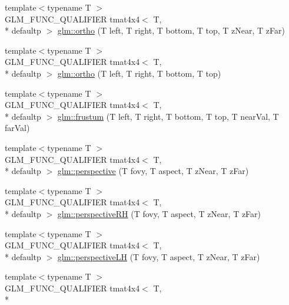 \begin{DoxyCompactItemize}
\item 
{\footnotesize template$<$typename T $>$ }\\G\-L\-M\-\_\-\-F\-U\-N\-C\-\_\-\-Q\-U\-A\-L\-I\-F\-I\-E\-R tmat4x4$<$ T, \\*
defaultp $>$ \hyperlink{group__gtc__matrix__transform_ga65280251de6e38580110a0577a43d8f8}{glm\-::ortho} (T left, T right, T bottom, T top, T z\-Near, T z\-Far)
\item 
{\footnotesize template$<$typename T $>$ }\\G\-L\-M\-\_\-\-F\-U\-N\-C\-\_\-\-Q\-U\-A\-L\-I\-F\-I\-E\-R tmat4x4$<$ T, \\*
defaultp $>$ \hyperlink{group__gtc__matrix__transform_ga45b1b64f99255c07119b4f1aaed04dd7}{glm\-::ortho} (T left, T right, T bottom, T top)
\item 
{\footnotesize template$<$typename T $>$ }\\G\-L\-M\-\_\-\-F\-U\-N\-C\-\_\-\-Q\-U\-A\-L\-I\-F\-I\-E\-R tmat4x4$<$ T, \\*
defaultp $>$ \hyperlink{group__gtc__matrix__transform_gada6deb989d4b553fe0f7e3279f3afae1}{glm\-::frustum} (T left, T right, T bottom, T top, T near\-Val, T far\-Val)
\item 
{\footnotesize template$<$typename T $>$ }\\G\-L\-M\-\_\-\-F\-U\-N\-C\-\_\-\-Q\-U\-A\-L\-I\-F\-I\-E\-R tmat4x4$<$ T, \\*
defaultp $>$ \hyperlink{group__gtc__matrix__transform_gac3613dcb6c6916465ad5b7ad5a786175}{glm\-::perspective} (T fovy, T aspect, T z\-Near, T z\-Far)
\item 
{\footnotesize template$<$typename T $>$ }\\G\-L\-M\-\_\-\-F\-U\-N\-C\-\_\-\-Q\-U\-A\-L\-I\-F\-I\-E\-R tmat4x4$<$ T, \\*
defaultp $>$ \hyperlink{group__gtc__matrix__transform_ga5a4fa9f8ffabb2294e48a18bf8fa2f5f}{glm\-::perspective\-R\-H} (T fovy, T aspect, T z\-Near, T z\-Far)
\item 
{\footnotesize template$<$typename T $>$ }\\G\-L\-M\-\_\-\-F\-U\-N\-C\-\_\-\-Q\-U\-A\-L\-I\-F\-I\-E\-R tmat4x4$<$ T, \\*
defaultp $>$ \hyperlink{group__gtc__matrix__transform_ga34048da27c559f1ac8e9550d169dd6f3}{glm\-::perspective\-L\-H} (T fovy, T aspect, T z\-Near, T z\-Far)
\item 
{\footnotesize template$<$typename T $>$ }\\G\-L\-M\-\_\-\-F\-U\-N\-C\-\_\-\-Q\-U\-A\-L\-I\-F\-I\-E\-R tmat4x4$<$ T, \\*

\end{DoxyCompactItemize}

